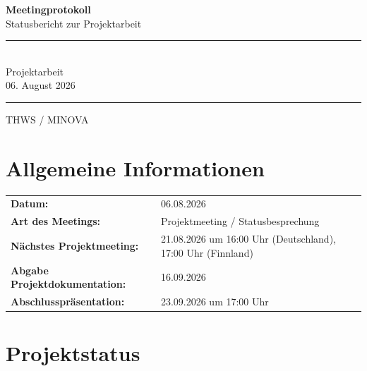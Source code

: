 \documentclass[a4paper,11pt]{article}
\begin{document}

\begin{titlepage}
    \centering

    \vspace*{3cm}

    {\Huge \textbf{Meetingprotokoll}}\\[0.5cm]
    {\Large Statusbericht zur Projektarbeit}\\[2cm]

    \rule{12cm}{0.5pt}\\[0.5cm]

    {\Large Projektarbeit}\\[0.3cm]
    {\large 06. August 2026}

    \rule{12cm}{0.5pt}

    \vfill

    {\large THWS / MINOVA}

\end{titlepage}


\tableofcontents
\newpage


\section{Allgemeine Informationen}

\begin{tabular}{ll}
\textbf{Datum:} & 06.08.2026 \\
\textbf{Art des Meetings:} & Projektmeeting / Statusbesprechung \\
\textbf{Nächstes Projektmeeting:} & 21.08.2026 um 16:00 Uhr (Deutschland), 17:00 Uhr (Finnland) \\
\textbf{Abgabe Projektdokumentation:} & 16.09.2026 \\
\textbf{Abschlusspräsentation:} & 23.09.2026 um 17:00 Uhr \\
\end{tabular}

\vspace{1cm}

\section{Projektstatus}
\end{document}
